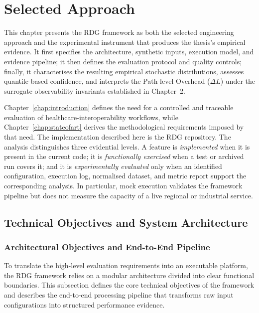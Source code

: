 \chapter{Selected Approach}
\label{chap:selected-approach}

\noindent This chapter presents the RDG framework as both the selected
engineering approach and the experimental instrument that produces the thesis's
empirical evidence. It first specifies the architecture, synthetic inputs,
execution model, and evidence pipeline; it then defines the evaluation protocol
and quality controls; finally, it characterises the resulting empirical
stochastic distributions, assesses quantile-based confidence, and interprets
the Path-level Overhead ($\Delta L$) under the surrogate observability
invariants established in Chapter~2.

\noindent Chapter~\ref{chap:introduction} defines the need for a controlled and
traceable evaluation of healthcare-interoperability workflows, while
Chapter~\ref{chap:stateofart} derives the methodological requirements imposed by
that need. The implementation described here is the RDG repository. The
analysis distinguishes three evidential levels. A feature
is \emph{implemented} when it is present in the current code; it is
\emph{functionally exercised} when a test or archived run covers it; and it is
\emph{experimentally evaluated} only when an identified configuration,
execution log, normalised dataset, and metric report support the corresponding
analysis. In particular, mock execution validates the framework pipeline but
does not measure the capacity of a live regional or industrial service.

\section{Technical Objectives and System Architecture}
\label{sec:rdg-objectives-architecture}

\subsection{Architectural Objectives and End-to-End Pipeline}
\label{subsec:rdg-objectives-pipeline}

\noindent To translate the high-level evaluation requirements into an executable
platform, the RDG framework relies on a modular architecture
divided into clear functional boundaries. This subsection defines the core
technical objectives of the framework and describes the end-to-end processing
pipeline that transforms raw input configurations into structured performance
evidence.

